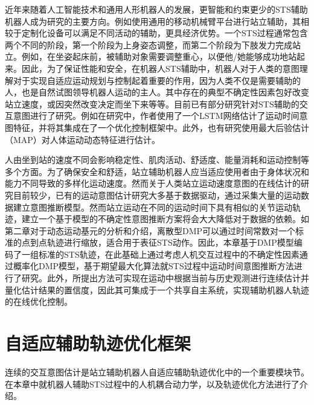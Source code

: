 近年来随着人工智能技术和通用人形机器人的发展，更智能和约束更少的STS辅助机器人成为研究的主要方向。例如使用通用的移动机械臂平台进行站立辅助，其相较于定制化设备可以满足不同活动的辅助，更具经济优势\cite{liIntegratedApproachRobotic2021}。一个STS过程通常包含两个不同的阶段，第一个阶段为上身姿态调整，而第二个阶段为下肢发力完成站立。例如，在坐姿起床前，被辅助对象需要调整重心，以便他/她能够成功地站起来。因此，为了保证性能和安全，在机器人STS辅助中，机器人对于人类的意图理解对于实现自适应运动规划与控制起着重要的作用，因为人类不仅是需要辅助的人，也是自然试图领导机器人运动的主人。其中存在的典型不确定性因素包好改变站立速度，或因突然改变决定而坐下来等等。目前已有部分研究针对STS辅助的交互意图进行了研究。例如在研究\cite{liIntegratedApproachRobotic2021}中，作者使用了一个LSTM网络估计了运动时间意图特征，并将其集成在了一个优化控制框架中。此外，也有研究使用最大后验估计（MAP）对人体运动动态特征进行估计\cite{romanoCoDyCoProjectAchievements2018}。

人由坐到站的速度不同会影响稳定性、肌肉活动、舒适度、能量消耗和运动控制等多个方面。为了确保安全和舒适，站立辅助机器人应当适应使用者由于身体状况和能力不同导致的多样化运动速度。然而关于人类站立运动速度意图的在线估计的研究目前较少，已有的运动意图估计研究大多基于数据驱动，通过采集大量的运动数据建立意图推断模型。然而站立运动在不同的运动时间下具有相似的关节运动轨迹，建立一个基于模型的不确定性意图推断方案将会大大降低对于数据的依赖。如第二章对于动态运动基元的分析和介绍，离散型DMP可以通过时间常数对一个标准的点到点轨迹进行缩放，适合用于表征STS动作。因此，本章基于DMP模型编码了一组标准的STS轨迹，在此基础上通过考虑人机交互过程中的不确定性因素通过概率化DMP模型，基于期望最大化算法就STS过程中运动时间意图推断方法进行了研究。此外，所提出方法可实现在运动中根据当前与历史观测进行连续估计并量化估计结果的置信度，因此其可集成于一个共享自主系统，实现辅助机器人轨迹的在线优化控制。
\section{自适应辅助轨迹优化框架}  
连续的交互意图估计是站立辅助机器人自适应辅助轨迹优化中的一个重要模块节。在本章中就机器人辅助STS过程中的人机耦合动力学，以及轨迹优化方法进行了介绍。
